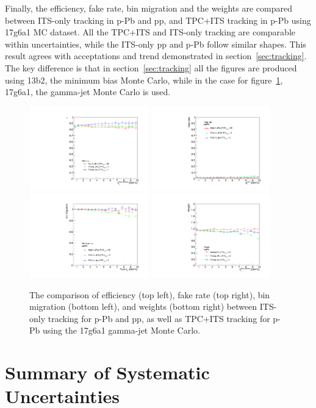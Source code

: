 Finally, the efficiency, fake rate, bin migration and the weights are compared between ITS-only tracking in p-Pb and pp, and TPC+ITS tracking in p-Pb using 17g6a1 MC dataset. All the TPC+ITS and ITS-only tracking are comparable within uncertainties, while the ITS-only pp and p-Pb follow similar shapes. This result agrees with acceptations and trend demonstrated in section~\ref{sec:tracking}. The key difference is that in section~\ref{sec:tracking} all the figures are produced using 13b2, the minimum bias Monte Carlo, while in the case for figure~\ref{fig:TPCITSpp_pPbCompare}, 17g6a1, the gamma-jet Monte Carlo is used. 
\begin{figure}[h]
\center
\includegraphics[width=0.46\textwidth]{Checks_Systematics/ITSchi2_study_efficiency.pdf}
\includegraphics[width=0.46\textwidth]{Checks_Systematics/ITSchi2_study_fakerate.pdf}
\includegraphics[width=0.46\textwidth]{Checks_Systematics/ITSchi2_study_binMigration.pdf}
\includegraphics[width=0.46\textwidth]{Checks_Systematics/ITSchi2_study_weight.pdf}
\caption{The comparison of efficiency (top left), fake rate (top right), bin migration (bottom left), and weights (bottom right) between ITS-only tracking for p-Pb and pp, as well as TPC+ITS tracking for p-Pb using the 17g6a1 gamma-jet Monte Carlo.\cite{PhysRevC.101.065204}}
\label{fig:TPCITSpp_pPbCompare}

\end{figure}

\section{Summary of Systematic Uncertainties}



